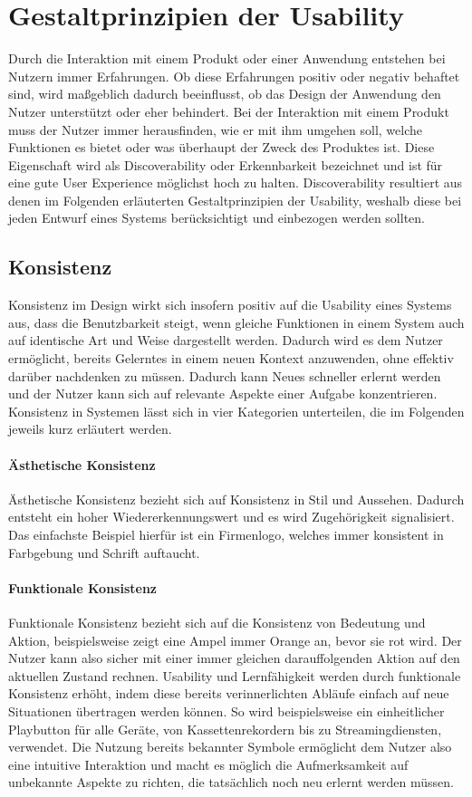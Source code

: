 \section{Gestaltprinzipien der Usability}
\label{ch:gestalt}
Durch die Interaktion mit einem Produkt oder einer Anwendung entstehen bei Nutzern immer Erfahrungen.
Ob diese Erfahrungen positiv oder negativ behaftet sind, wird maßgeblich dadurch beeinflusst, ob das Design der Anwendung den Nutzer unterstützt oder eher behindert.
Bei der Interaktion mit einem Produkt muss der Nutzer immer herausfinden, wie er mit ihm umgehen soll, welche Funktionen es bietet oder was überhaupt der Zweck des Produktes ist.
Diese Eigenschaft wird als Discoverability oder Erkennbarkeit bezeichnet und ist für eine gute User Experience möglichst hoch zu halten.
Discoverability resultiert aus denen im  Folgenden erläuterten Gestaltprinzipien der Usability, weshalb diese bei jeden Entwurf eines Systems berücksichtigt und einbezogen werden sollten\cite{Norman.2016}.

\subsection*{Konsistenz}
Konsistenz im Design wirkt sich insofern positiv auf die Usability eines Systems aus, dass die Benutzbarkeit steigt, wenn gleiche Funktionen in einem System auch auf identische Art und Weise dargestellt werden.
Dadurch wird es dem Nutzer ermöglicht, bereits Gelerntes in einem neuen Kontext anzuwenden, ohne effektiv darüber nachdenken zu müssen.
Dadurch kann Neues schneller erlernt werden und der Nutzer kann sich auf relevante Aspekte einer Aufgabe konzentrieren.
Konsistenz in Systemen lässt sich in vier Kategorien unterteilen, die im Folgenden jeweils kurz erläutert werden.

\paragraph{Ästhetische Konsistenz}
Ästhetische Konsistenz bezieht sich auf Konsistenz in Stil und Aussehen. Dadurch entsteht ein hoher Wiedererkennungswert und es wird Zugehörigkeit signalisiert. Das einfachste Beispiel hierfür ist ein Firmenlogo, welches immer konsistent in Farbgebung und Schrift auftaucht.

\paragraph{Funktionale Konsistenz}
Funktionale Konsistenz bezieht sich auf die Konsistenz von Bedeutung und Aktion, beispielsweise zeigt eine Ampel immer Orange an, bevor sie rot wird. Der Nutzer kann also sicher mit einer immer gleichen darauffolgenden Aktion auf den aktuellen Zustand rechnen. 
Usability und Lernfähigkeit werden durch funktionale Konsistenz erhöht, indem diese bereits verinnerlichten Abläufe einfach auf neue Situationen übertragen werden können. So wird beispielsweise ein einheitlicher Playbutton für alle Geräte, von Kassettenrekordern bis zu Streamingdiensten, verwendet.
Die Nutzung bereits bekannter Symbole ermöglicht dem Nutzer also eine intuitive Interaktion und macht es möglich die Aufmerksamkeit auf unbekannte Aspekte zu richten, die tatsächlich noch neu erlernt werden müssen.

